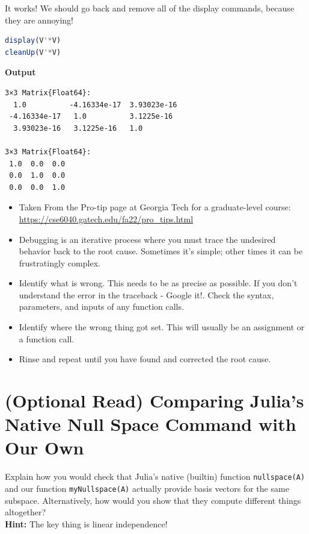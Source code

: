 It works! We should go back and remove all of the display commands, because they are annoying!

\begin{lstlisting}[language=Julia,style=mystyle]
display(V'*V)
cleanUp(V'*V)
\end{lstlisting}
\textbf{Output} 
\begin{verbatim}
3×3 Matrix{Float64}:
  1.0          -4.16334e-17  3.93023e-16
 -4.16334e-17   1.0          3.1225e-16
  3.93023e-16   3.1225e-16   1.0

3×3 Matrix{Float64}:
 1.0  0.0  0.0
 0.0  1.0  0.0
 0.0  0.0  1.0
\end{verbatim}

\begin{tcolorbox}[title={\large \bf Reminder on Debugging}]

    \begin{itemize}
        \item Taken From the Pro-tip page at Georgia Tech for a graduate-level course: \url{https://cse6040.gatech.edu/fa22/pro_tips.html}

        \item Debugging is an iterative process where you must trace the undesired behavior back to the root cause. Sometimes it's simple; other times it can be frustratingly complex.

        \item Identify what is wrong. This needs to be as precise as possible. If you don't understand the error in the traceback - Google it!. Check the syntax, parameters, and inputs of any function calls.

        \item Identify where the wrong thing got set. This will usually be an assignment or a function call.

        \item Rinse and repeat until you have found and corrected the root cause.
    \end{itemize}
\end{tcolorbox}

\section{(Optional Read) Comparing Julia's Native Null Space Command with Our Own}

\begin{exercise} Explain how you would check that Julia's native (builtin) function \texttt{nullspace(A)} and our function \texttt{myNullspace(A)} actually provide basis vectors for the same subspace. Alternatively, how would you show that they compute different things altogether? \\

\textbf{Hint:} The key thing is linear independence!
\end{exercise}

